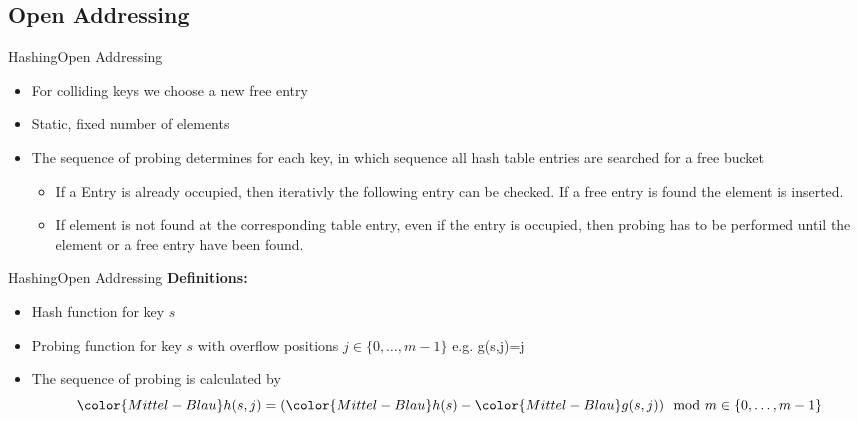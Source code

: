 \subsection{Open Addressing}

\begin{frame}{Hashing}{Open Addressing}
  \begin{itemize}
    \item<2->
      For colliding keys we choose a new free entry
    \item<3->
      Static, fixed number of elements
    \item<4->
      The sequence of probing determines for each key, in which sequence
      all hash table entries are searched for a free bucket
      \begin{itemize}
      \item<5->
        If a Entry is already occupied, then iterativly the {\color{Mittel-Blau}following entry} can
        be checked. If a free entry is found the element is inserted.
      \item<6->
        If element is not found at the corresponding table entry, even if
        the entry is occupied, then probing has to be performed until
        the element or a free entry have been found.
    \end{itemize}
  \end{itemize}  
\end{frame}


\begin{frame}{Hashing}{Open Addressing}
  \textbf{Definitions:}
  \begin{itemize}
    \item<2->[\color{Mittel-Blau}$h(s)$]
      Hash function for key {\color{Mittel-Blau}$s$}
    \item<3->[\color{Mittel-Blau}$g(s,j)$]
      Probing function for key {\color{Mittel-Blau}$s$}
      with overflow positions {\color{Mittel-Blau}$j \in \{0,\dots,m-1\}$}
      e.g. {\color{Mittel-Blau}g(s,j)=j}
    \item<4->
      The sequence of probing is calculated by
      \begin{displaymath}
        {\color{Mittel-Blau}h(s,j)}
        = ({\color{Mittel-Blau}h(s)} - {\color{Mittel-Blau}g(s,j)})
        \mod m \in \{0,\dots,m-1\}
      \end{displaymath}
  \end{itemize}
\end{frame}

